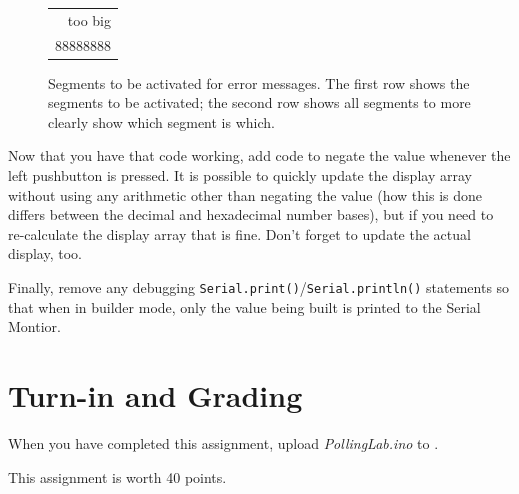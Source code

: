 \begin{figure}
    \centering
    {\dviiseg \huge \begin{tabular}{r} too big \\
                                      88888888 \\
                                    \end{tabular}}
    \caption{Segments to be activated for error messages.
        The first row shows the segments to be activated;
        the second row shows all segments to more clearly show which segment is
        which. \label{fig:SevenSegmentError}}
\end{figure}

Now that you have that code working, add code to negate the value whenever the
left pushbutton is pressed. It is possible to quickly update the display array
without using any arithmetic other than negating the value (how this is done
differs between the decimal and hexadecimal number bases), but if you need to
re-calculate the display array that is fine. Don't forget to update the actual
display, too.

Finally, remove any debugging
\lstinline{Serial.print()}/\lstinline{Serial.println()} statements so that when
in builder mode, only the value being built is printed to the Serial Montior.

\section*{Turn-in and Grading}

When you have completed this assignment, upload \textit{PollingLab.ino} to
\filesubmission.

This assignment is worth 40 points. \\

